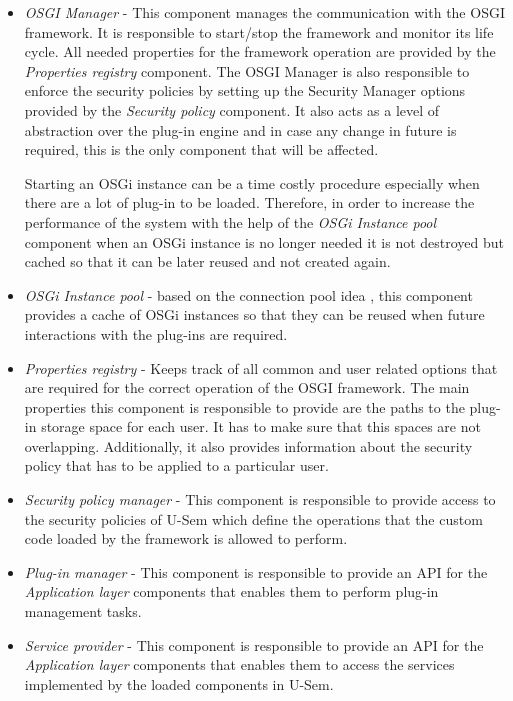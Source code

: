 \begin{itemize}

\item \textit{OSGI Manager} - This component manages the communication with the OSGI framework. It is responsible to start/stop the framework and monitor its life cycle. All needed properties for the framework operation are provided by the \textit{Properties registry} component. The OSGI Manager is also responsible to enforce the security policies by setting up the Security Manager options provided by the \textit{Security policy} component. It also acts as a level of abstraction over the plug-in engine and in case any change in future is required, this is the only component that will be affected. 

Starting an OSGi instance can be a time costly procedure especially when there are a lot of plug-in to be loaded. Therefore, in order to increase the performance of the system with the help of the \textit{OSGi Instance pool} component when an OSGi instance is no longer needed it is not destroyed but cached so that it can be later reused and not created again.

\item \textit{OSGi Instance pool} - based on the connection pool idea \cite{zhao2004design}, this component provides a cache of OSGi instances so that they can be reused when future interactions with the plug-ins are required.

\item \textit{Properties registry} - Keeps track of all common and user related options that are required for the correct operation of the OSGI framework. The main properties this component is responsible to provide are the paths to the plug-in storage space for each user. It has to make sure that this spaces are not overlapping. Additionally, it also provides information about the security policy that has to be applied to a particular user. 

\item \textit{Security policy manager} - This component is responsible to provide access to the security policies of U-Sem which define the operations that the custom code loaded by the framework is allowed to perform.

\item \textit{Plug-in manager} - This component is responsible to provide an API for the \textit{Application layer} components that enables them to perform plug-in management tasks.

\item \textit{Service provider} - This component is responsible to provide an API for the \textit{Application layer} components that enables them to access the services implemented by the loaded components in U-Sem.

\end{itemize}

